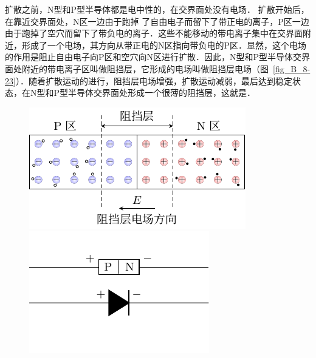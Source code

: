 扩散之前，N型和P型半导体都是电中性的，在交界面处没有电场．
扩散开始后，在靠近交界面处，N区一边由于跑掉
了自由电子而留下了带正电的离子，P区一边由于跑掉了空穴而留下了带负电的离子．这些不能移动的带电离子集中在交界面附近，形成了一个电场，其方向从带正电的N区指向带负电的P区．显然，这个电场的作用是阻止自由电子向P区和空穴向N区进行扩散．因此，N型和P型半导体交界面处附近的带电离子区叫做阻挡层，它形成的电场叫做阻挡层电场（图~\ref{fig_B_8-23}）．随着扩散运动的进行，阻挡层电场增强，扩散运动减弱，最后达到稳定状态，在N型和P型半导体交界面处形成一个很薄的阻挡层，这就是．
\begin{figure}[htbp]
    \centering
    \begin{minipage}[t]{0.48\linewidth}
    	\centering
    	\includegraphics{fig/B/8-23.pdf}
    	\caption{}\label{fig_B_8-23}
    \end{minipage}
    \begin{minipage}[t]{0.48\linewidth}
    	\centering
    	\includegraphics{fig/B/8-24.pdf}
    	\caption{}\label{fig_B_8-24}
	\end{minipage}
\end{figure}


